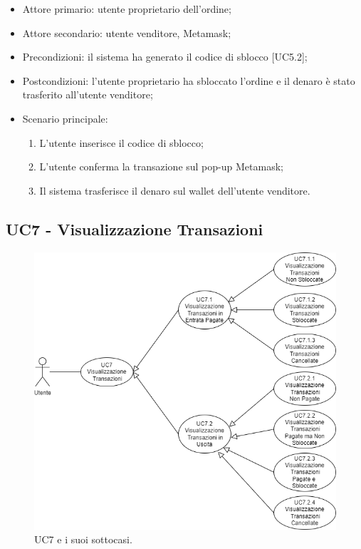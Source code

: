 \begin{itemize}
    \item Attore primario: utente proprietario dell'ordine;
    \item Attore secondario: utente venditore, Metamask\glo{};
    \item Precondizioni: il sistema ha generato il codice di sblocco [UC5.2];
    \item Postcondizioni: l'utente proprietario ha sbloccato l'ordine e il denaro è stato trasferito all'utente venditore;
    \item Scenario principale:
          \begin{enumerate}
              \item L'utente inserisce il codice di sblocco;
              \item L'utente conferma la transazione sul pop-up Metamask\glo{};
              \item Il sistema trasferisce il denaro sul wallet\glo{} dell'utente venditore.
          \end{enumerate}
\end{itemize}

\subsection{UC7 - Visualizzazione Transazioni}

\begin{figure}[H]
    \centering
    \includegraphics[scale=0.7]{immagini/UseCases-UC7.png}
    \caption{UC7 e i suoi sottocasi.}
\end{figure}


